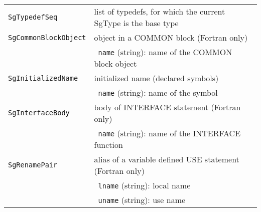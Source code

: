 \begin{longtable}[l]{l|p{10cm}}
\texttt{SgTypedefSeq}& list of typedefs, for which the current SgType is the base type\\
\texttt{SgCommonBlockObject}& object in a COMMON block (Fortran only)\\
 & ~\texttt{name} (string): name of the COMMON block object \\
\texttt{SgInitializedName}& initialized name (declared symbols)\\
 & ~\texttt{name} (string): name of the symbol \\
\texttt{SgInterfaceBody}& body of INTERFACE statement (Fortran only)\\
 & ~\texttt{name} (string): name of the INTERFACE function \\
 \texttt{SgRenamePair}& alias of a variable defined USE statement (Fortran only)\\
 & ~\texttt{lname} (string): local name\\
 & ~\texttt{uname} (string): use name\\
\end{longtable}
